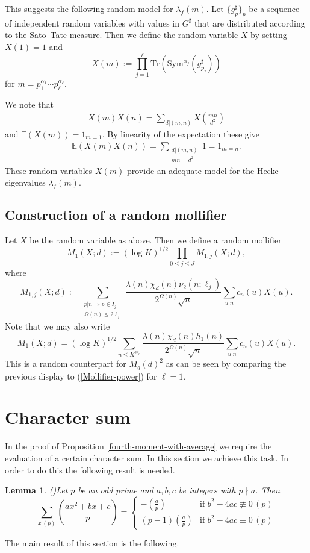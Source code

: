 \documentclass[a4paper,10pt,twoside]{amsart}
\newtheorem{lemma}[theorem]{Lemma}
\theoremstyle{definition}
\numberwithin{equation}{section}
\renewcommand\:{\colon}
\begin{document}
This suggests the following random model for $\lambda_f(m)$. Let $\{g_p^\sharp\}_p$ be a sequence of independent random variables with values in $G^\sharp$ that are distributed according to the Sato--Tate measure. Then we define the random variable $X$ by setting $X(1)=1$ and 
\[
X(m):=\prod_{j=1}^\ell \text{Tr}\left(\text{Sym}^{\alpha_j}(g^\sharp_{p_j})\right)\]
for $m=p_1^{\alpha_1}\cdots p_\ell^{\alpha_\ell}$.

We note that 
\begin{align}\label{random-Hecke}
X(m)X(n)=\sum_{d|(m,n)}X\left(\frac{mn}{d^2}\right)
\end{align}
and $\mathbb E(X(m))=1_{m=1}$. By linearity of the expectation these give
\begin{align}\label{correlation-expectation}
\mathbb E(X(m)X(n))=\sum_{\substack{d|(m,n)\\
mn=d^2}}1=1_{m=n}.
\end{align}
These random variables $X(m)$ provide an adequate model for the Hecke eigenvalues $\lambda_f(m)$.

\subsection{Construction of a random mollifier}

Let $X$ be the random variable as above. Then we define a random mollifier
\[ 
M_1(X;d):=(\log K)^{1/2}\prod_{0\leq j\leq J}M_{1,j}(X;d),\]
where 
\[ 
M_{1,j}(X;d):=\sum_{\substack{p|n\Rightarrow p\in I_j\\
\Omega(n)\leq 2\ell_j}}\frac{\lambda(n)\chi_d(n)\nu_2(n;\ell_j)}{2^{\Omega(n)}\sqrt n}\sum_{u|n}c_n(u)X(u). 
\]
Note that we may also write
\[ 
M_1(X;d)=(\log K)^{1/2}\sum_{n\leq K^{2\delta_0}}\frac{\lambda(n)\chi_d(n)h_1(n)}{2^{\Omega(n)}\sqrt n}\sum_{u|n}c_n(u)X(u).
\]
This is a random counterpart for $M_g(d)^2$ as can be seen by comparing the previous display to (\ref{Mollifier-power}) for $\ell=1$. 

\section{Character sum}

\noindent In the proof of Proposition \ref{fourth-moment-with-average} we require the evaluation of a certain character sum. In this section we achieve this task. In order to do this the following result is needed.

\begin{lemma}(\cite[Theorem 2.1.2.]{BEW})\label{quad_char_quad_pol} Let $p$ be an odd prime and $a,b,c$ be integers with $p\nmid a$. Then 
\[ 
\sum_{x\,(p)}\left(\frac{ax^2+bx+c}p\right)=\begin{cases}
-\left(\frac ap\right) & \text{if }b^2-4ac\not\equiv 0\,(p) \\
(p-1)\left(\frac ap\right) & \text{if }b^2-4ac\equiv 0\,(p)
\end{cases}\]
\end{lemma}
\noindent The main result of this section is the following. 
\end{document}
